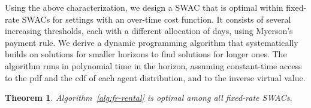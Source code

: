 \documentclass[11pt,letterpaper]{article}
\newcommand{\fr}{fixed-rate\xspace}
\newcommand{\swac}{SWAC\xspace}
\newcommand{\swacs}{SWACs\xspace}
\newcommand{\finaucs}{finite-menu \swacs}
\newcommand{\g}{g}
\theoremstyle{plain}
\newtheorem{theorem}{Theorem}[section]
\begin{document}
Using the above characterization, we design a \swac that is optimal within \fr \swacs for settings with an over-time cost function. 
It consists of several increasing thresholds, each with a different allocation of days,
using Myerson's payment rule.
We derive a dynamic programming algorithm that systematically builds on solutions for smaller horizons to find solutions for longer ones. The algorithm
runs in polynomial time in the horizon, assuming constant-time access to the pdf and the cdf
of each agent distribution,
and to the inverse virtual value.


\begin{theorem}\label{thm:optima-fr-rental-mech}
Algorithm~\ref{alg:fr-rental} is optimal among all \fr \swacs.
\end{theorem}
\end{document}
